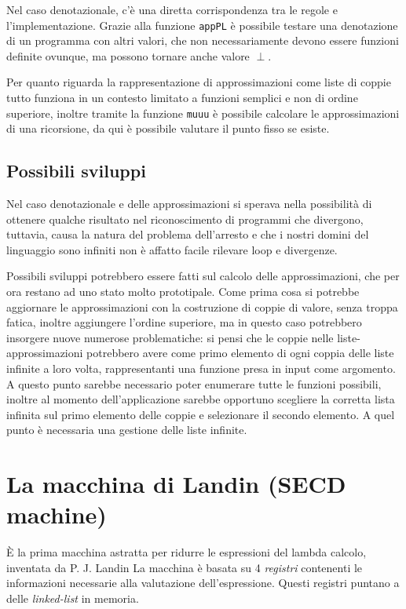 \documentclass{article}
\begin{document}
Nel caso denotazionale, c'è una diretta corrispondenza tra le regole e l'implementazione.
Grazie alla funzione \texttt{appPL} è possibile testare una denotazione di un programma con altri valori, che non necessariamente devono essere funzioni definite ovunque, ma possono tornare anche valore $\perp$.

Per quanto riguarda la rappresentazione di approssimazioni come liste di coppie tutto funziona in un contesto limitato a funzioni semplici e non di ordine superiore, inoltre tramite la funzione \texttt{muuu} è possibile calcolare le approssimazioni di una ricorsione, da qui è possibile valutare il punto fisso se esiste.


\subsection{Possibili sviluppi}
Nel caso denotazionale e delle approssimazioni si sperava nella possibilità di ottenere qualche risultato nel riconoscimento di programmi che divergono, tuttavia, causa la natura del problema dell'arresto e che i nostri domini del linguaggio sono infiniti non è affatto facile rilevare loop e divergenze.

Possibili sviluppi potrebbero essere fatti sul calcolo delle approssimazioni, che per ora restano ad uno stato molto prototipale. Come prima cosa si potrebbe aggiornare le approssimazioni con la costruzione di coppie di valore, senza troppa fatica, inoltre aggiungere l'ordine superiore, ma in questo caso potrebbero insorgere nuove numerose problematiche: si pensi che le coppie nelle liste-approssimazioni potrebbero avere come primo elemento di ogni coppia delle liste infinite a loro volta, rappresentanti una funzione presa in input come argomento. A questo punto sarebbe necessario poter enumerare tutte le funzioni possibili, inoltre al momento dell'applicazione sarebbe opportuno scegliere la corretta lista infinita sul primo elemento delle coppie e selezionare il secondo elemento. A quel punto è necessaria una gestione delle liste infinite.


\appendix

\section{La macchina di Landin (SECD machine)}
\label{sec:landin}
È la prima macchina astratta per ridurre le espressioni del lambda calcolo, inventata da P. J. Landin La macchina è basata su 4 \emph{registri} contenenti le informazioni necessarie alla valutazione dell'espressione. Questi registri puntano a delle \emph{linked-list} in memoria.
\end{document}
